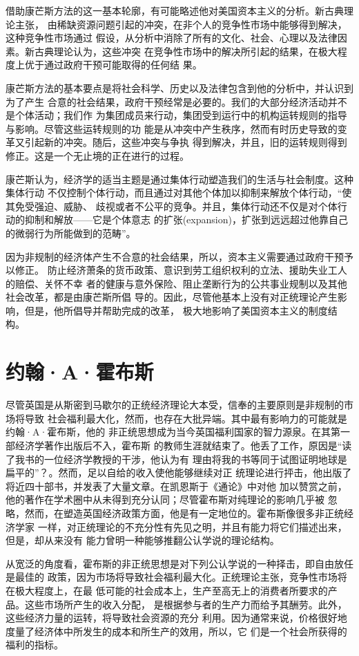 借助康芒斯方法的这一基本轮廓，有可能略述他对美国资本主义的分析。新古典理论主张，
由稀缺资源问题引起的冲突，在非个人的竞争性市场中能够得到解决，这种竞争性市场通过
假设，从分析中消除了所有的文化、社会、心理以及法律因素。新古典理论认为，这些冲突
在竞争性市场中的解决所引起的结果，在极大程度上优于通过政府干预可能取得的任何结
果。

康芒斯方法的基本要点是将社会科学、历史以及法律包含到他的分析中，并认识到为了产生
合意的社会结果，政府干预经常是必要的。我们的大部分经济活动并不是个体活动；我们作
为集团成员来行动，集团受到运行中的机构运转规则的指导与影响。尽管这些运转规则的功
能是从冲突中产生秩序，然而有时历史导致的变革又引起新的冲突。随后，这些冲突与争执
得到解决，并且，旧的运转规则得到修正。这是一个无止境的正在进行的过程。

康芒斯认为，经济学的适当主题是通过集体行动塑造我们的生活与社会制度。这种集体行动
不仅控制个体行动，而且通过对其他个体加以抑制来解放个体行动，“使其免受强迫、威胁、
歧视或者不公平的竞争。并且，集体行动还不仅是对个体行动的抑制和解放——它是个体意志
的扩张(expansion)，扩张到远远超过他靠自己的微弱行为所能做到的范畴”。

因为非规制的经济体产生不合意的社会结果，所以，资本主义需要通过政府干预予以修正。
防止经济萧条的货币政策、意识到劳工组织权利的立法、援助失业工人的赔偿、关怀不幸
者的健康与意外保险、阻止垄断行为的公共事业规制以及其他社会改革，都是由康芒斯所倡
导的。因此，尽管他基本上没有对正统理论产生影响，但是，他所倡导并帮助完成的改革，
极大地影响了美国资本主义的制度结构。

\section{约翰·A·霍布斯}

尽管英国是从斯密到马歇尔的正统经济理论大本受，信奉的主要原则是非规制的市场将导致
社会福利最大化，然而，也存在大批异端。其中最有影响力的可能就是约翰·A·霍布斯，他的
非正统思想成为当今英国福利国家的智力源泉。在其第一部经济学著作出版后不入，霍布斯
的教师生涯就结束了。他丢了工作，原因是“读了我书的一位经济学教授的干涉，他认为有
理由将我的书等同于试图证明地球是扁平的”？。然而，足以自给的收入使他能够继续对正
统理论进行抨击，他出版了将近四十部书，并发表了大量文章。在凯恩斯于《通论》中对他
加以赞赏之前，他的著作在学术圈中从未得到充分认同；尽管霍布斯对纯理论的影响几乎被
忽略，然而，在塑造英国经济政策方面，他是有一定地位的。霍布斯像很多非正统经济学家
一样，对正统理论的不充分性有先见之明，并且有能力将它们描述出来，但是，却从来没有
能力曾明一种能够推翻公认学说的理论结构。

从宽泛的角度看，霍布斯的非正统思想是对下列公认学说的一种择击，即自由放任是最佳的
政策，因为市场将导致社会福利最大化。正统理论主张，竞争性市场将在极大程度上，在最
低可能的社会成本上，生产至高无上的消费者所要求的产品。这些市场所产生的收入分配，
是根据参与者的生产力而给予其酬劳。此外，这些经济力量的运转，将导致社会资源的充分
利用。因为通常来说，价格很好地度量了经济体中所发生的成本和所生产的效用，所以，它
们是一个社会所获得的福利的指标。

